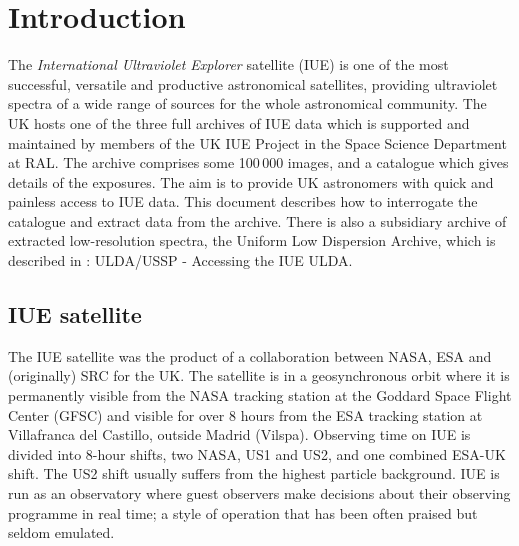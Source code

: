  \newpage
 \begin{latexonly}
   \setlength{\parskip}{0mm}
   \latexonlytoc
   \setlength{\parskip}{\medskipamount}
   \markright{\stardocname}
 \end{latexonly}
\newpage
\renewcommand{\thepage}{\arabic{page}}
\setcounter{page}{1}

\section {Introduction}

The {\it International Ultraviolet Explorer\/} satellite (IUE) is one of the
most successful, versatile and productive astronomical satellites, providing
ultraviolet spectra of a wide range of sources for the whole astronomical
community.
The UK hosts one of the three full archives of IUE data
which is supported and maintained by members of the UK IUE 
Project in the Space Science Department at RAL. 
The archive comprises some 100\,000 images,
and a catalogue which gives details of the exposures. 
The aim is to provide UK astronomers with quick and painless 
access to IUE data.
This document describes how to interrogate the catalogue and extract data from
the archive. 
There is also a subsidiary archive of extracted low-resolution spectra, the 
Uniform Low Dispersion Archive,
which is described in 
: ULDA/USSP - Accessing the IUE ULDA.

\subsection {IUE satellite}
The IUE satellite was the product
of a collaboration between NASA, ESA and (originally) SRC for the UK.
The satellite is in a geosynchronous orbit where it is permanently visible from
the NASA tracking station at the Goddard Space Flight Center (GFSC) and visible
for over 8 hours from the ESA tracking station at Villafranca del Castillo,
outside Madrid (Vilspa).
Observing time on IUE is divided into 8-hour shifts, two NASA, US1
and US2, and one combined ESA-UK shift.
The US2 shift usually suffers from the highest particle background.
IUE is run as an observatory where guest observers make decisions 
about their observing programme in real time; a style of operation 
that has been often praised but seldom emulated.


